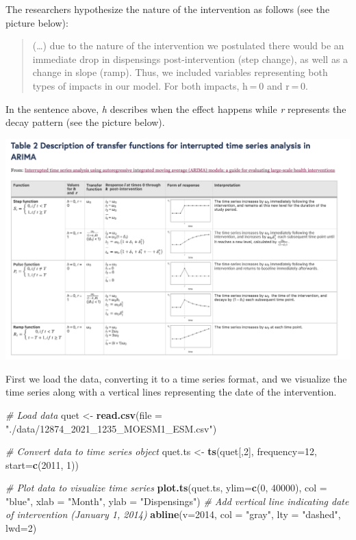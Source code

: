 \documentclass[
]{article}
\newenvironment{Shaded}{\begin{snugshade}}{\end{snugshade}}
\newcommand{\CommentTok}[1]{\textcolor[rgb]{0.56,0.35,0.01}{\textit{#1}}}
\newcommand{\DataTypeTok}[1]{\textcolor[rgb]{0.13,0.29,0.53}{#1}}
\newcommand{\DecValTok}[1]{\textcolor[rgb]{0.00,0.00,0.81}{#1}}
\newcommand{\KeywordTok}[1]{\textcolor[rgb]{0.13,0.29,0.53}{\textbf{#1}}}
\newcommand{\NormalTok}[1]{#1}
\newcommand{\StringTok}[1]{\textcolor[rgb]{0.31,0.60,0.02}{#1}}
\begin{document}
The researchers hypothesize the nature of the intervention as follows (see the picture below):

\begin{quote}
(\ldots) due to the nature of the intervention we postulated there would be an immediate drop in dispensings post-intervention (step change), as well as a change in slope (ramp). Thus, we included variables representing both types of impacts in our model. For both impacts, h = 0 and r = 0.
\end{quote}

In the sentence above, \emph{h} describes when the effect happens while \emph{r} represents the decay pattern (see the picture below).

\includegraphics[width=31.14in]{images/intervention-functions}

First we load the data, converting it to a time series format, and we visualize the time series along with a vertical lines representing the date of the intervention.

\begin{Shaded}
\begin{Highlighting}[]
\CommentTok{# Load data}
\NormalTok{quet <-}\StringTok{ }\KeywordTok{read.csv}\NormalTok{(}\DataTypeTok{file =} \StringTok{"./data/12874_2021_1235_MOESM1_ESM.csv"}\NormalTok{)}

\CommentTok{# Convert data to time series object}
\NormalTok{quet.ts <-}\StringTok{ }\KeywordTok{ts}\NormalTok{(quet[,}\DecValTok{2}\NormalTok{], }\DataTypeTok{frequency=}\DecValTok{12}\NormalTok{, }\DataTypeTok{start=}\KeywordTok{c}\NormalTok{(}\DecValTok{2011}\NormalTok{, }\DecValTok{1}\NormalTok{))}

\CommentTok{# Plot data to visualize time series}
\KeywordTok{plot.ts}\NormalTok{(quet.ts, }\DataTypeTok{ylim=}\KeywordTok{c}\NormalTok{(}\DecValTok{0}\NormalTok{, }\DecValTok{40000}\NormalTok{), }\DataTypeTok{col =} \StringTok{"blue"}\NormalTok{, }\DataTypeTok{xlab =} \StringTok{"Month"}\NormalTok{, }\DataTypeTok{ylab =} \StringTok{"Dispensings"}\NormalTok{)}
\CommentTok{# Add vertical line indicating date of intervention (January 1, 2014)}
\KeywordTok{abline}\NormalTok{(}\DataTypeTok{v=}\DecValTok{2014}\NormalTok{, }\DataTypeTok{col =} \StringTok{"gray"}\NormalTok{, }\DataTypeTok{lty =} \StringTok{"dashed"}\NormalTok{, }\DataTypeTok{lwd=}\DecValTok{2}\NormalTok{)}
\end{Highlighting}
\end{Shaded}
\end{document}
